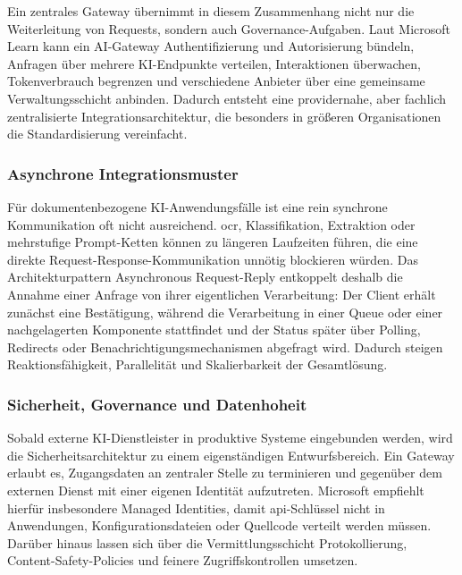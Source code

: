 Ein zentrales Gateway übernimmt in diesem Zusammenhang nicht nur die Weiterleitung von Requests, sondern auch Governance-Aufgaben. Laut Microsoft Learn kann ein AI-Gateway Authentifizierung und Autorisierung bündeln, Anfragen über mehrere KI-Endpunkte verteilen, Interaktionen überwachen, Tokenverbrauch begrenzen und verschiedene Anbieter über eine gemeinsame Verwaltungsschicht anbinden. Dadurch entsteht eine providernahe, aber fachlich zentralisierte Integrationsarchitektur, die besonders in größeren Organisationen die Standardisierung vereinfacht. \cite{azure_ai_gateway_apim}

\subsubsection{Asynchrone Integrationsmuster}

Für dokumentenbezogene KI-Anwendungsfälle ist eine rein synchrone Kommunikation oft nicht ausreichend. \acrshort{ocr}, Klassifikation, Extraktion oder mehrstufige Prompt-Ketten können zu längeren Laufzeiten führen, die eine direkte Request-Response-Kommunikation unnötig blockieren würden. Das Architekturpattern \glqq Asynchronous Request-Reply\grqq{} entkoppelt deshalb die Annahme einer Anfrage von ihrer eigentlichen Verarbeitung: Der Client erhält zunächst eine Bestätigung, während die Verarbeitung in einer Queue oder einer nachgelagerten Komponente stattfindet und der Status später über Polling, Redirects oder Benachrichtigungsmechanismen abgefragt wird. Dadurch steigen Reaktionsfähigkeit, Parallelität und Skalierbarkeit der Gesamtlösung. \cite{azure_async_request_reply}

\subsubsection{Sicherheit, Governance und Datenhoheit}

Sobald externe KI-Dienstleister in produktive Systeme eingebunden werden, wird die Sicherheitsarchitektur zu einem eigenständigen Entwurfsbereich. Ein Gateway erlaubt es, Zugangsdaten an zentraler Stelle zu terminieren und gegenüber dem externen Dienst mit einer eigenen Identität aufzutreten. Microsoft empfiehlt hierfür insbesondere Managed Identities, damit \acrshort{api}-Schlüssel nicht in Anwendungen, Konfigurationsdateien oder Quellcode verteilt werden müssen. Darüber hinaus lassen sich über die Vermittlungsschicht Protokollierung, Content-Safety-Policies und feinere Zugriffskontrollen umsetzen. \cite{azure_ai_gateway_apim,azure_openai_gateway_multi_backend}

